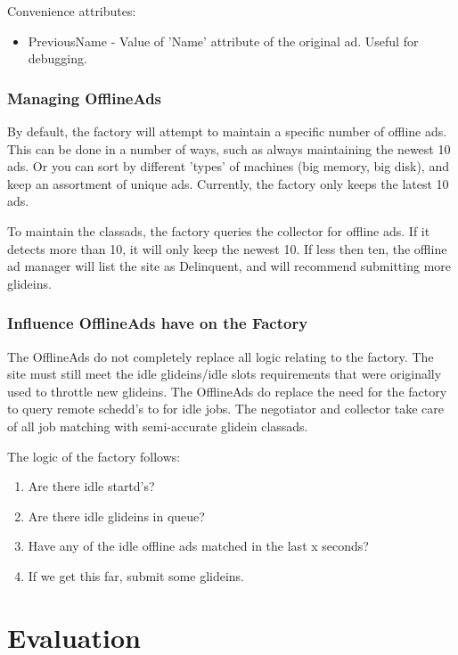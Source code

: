\documentclass[11pt]{article}
\begin{document}
Convenience attributes: 
\begin{itemize}
\item PreviousName - Value of 'Name' attribute of the original ad. Useful for debugging. 
\end{itemize}

\subsubsection{Managing OfflineAds}
By default, the factory will attempt to maintain a specific number of offline ads. This can be done in a number of ways, such as always maintaining the newest 10 ads. Or you can sort by different 'types' of machines (big memory, big disk), and keep an assortment of unique ads.  Currently, the factory only keeps the latest 10 ads.

To maintain the classads, the factory queries the collector for offline ads. If it detects more than 10, it will only keep the newest 10. If less then ten, the offline ad manager will list the site as Delinquent, and will recommend submitting more glideins.

\subsubsection{Influence OfflineAds have on the Factory}
The OfflineAds do not completely replace all logic relating to the factory. The site must still meet the idle glideins/idle slots requirements that were originally used to throttle new glideins. The OfflineAds do replace the need for the factory to query remote schedd's to for idle jobs. The negotiator and collector take care of all job matching with semi-accurate glidein classads.

The logic of the factory follows:

\begin{enumerate}
\item Are there idle startd's?
\item Are there idle glideins in queue?
\item Have any of the idle offline ads matched in the last x seconds?
\item If we get this far, submit some glideins. 
\end{enumerate}


\section{Evaluation}
\label{sec:Evaluation}
\end{document}
